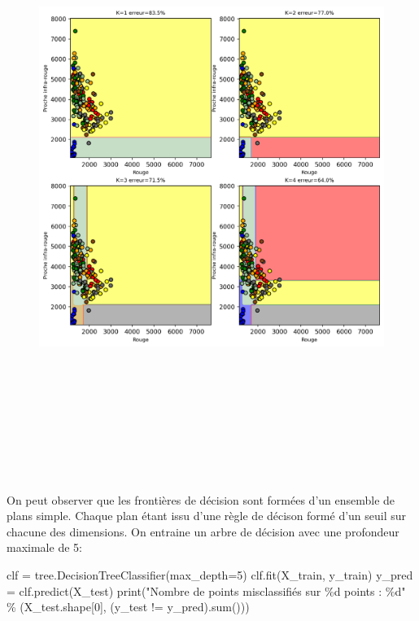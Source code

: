 \documentclass[
]{article}
\newenvironment{Shaded}{}{}
\newcommand{\BuiltInTok}[1]{\textcolor[rgb]{0.00,0.50,0.00}{#1}}
\newcommand{\DecValTok}[1]{\textcolor[rgb]{0.25,0.63,0.44}{#1}}
\newcommand{\NormalTok}[1]{#1}
\newcommand{\OperatorTok}[1]{\textcolor[rgb]{0.40,0.40,0.40}{#1}}
\newcommand{\SpecialCharTok}[1]{\textcolor[rgb]{0.25,0.44,0.63}{#1}}
\newcommand{\StringTok}[1]{\textcolor[rgb]{0.25,0.44,0.63}{#1}}
\begin{document}
\begin{figure}
\centering
\includegraphics[width=7.78125in,height=7.6875in]{05-ClassificationsSupervisees_files/figure-html/cell-34-output-2.png}
\caption{}
\end{figure}

On peut observer que les frontières de décision sont formées d'un
ensemble de plans simple. Chaque plan étant issu d'une règle de décison
formé d'un seuil sur chacune des dimensions. On entraine un arbre de
décision avec une profondeur maximale de 5:

\label{851bd868}
\label{cb38}
\begin{Shaded}
\begin{Highlighting}[]
\NormalTok{clf }\OperatorTok{=}\NormalTok{ tree.DecisionTreeClassifier(max\_depth}\OperatorTok{=}\DecValTok{5}\NormalTok{)}
\NormalTok{clf.fit(X\_train, y\_train)}
\NormalTok{y\_pred }\OperatorTok{=}\NormalTok{ clf.predict(X\_test)}
\BuiltInTok{print}\NormalTok{(}\StringTok{"Nombre de points misclassifiés sur }\SpecialCharTok{\%d}\StringTok{ points : }\SpecialCharTok{\%d}\StringTok{"}
  \OperatorTok{\%}\NormalTok{ (X\_test.shape[}\DecValTok{0}\NormalTok{], (y\_test }\OperatorTok{!=}\NormalTok{ y\_pred).}\BuiltInTok{sum}\NormalTok{()))}
\end{Highlighting}
\end{Shaded}
\end{document}
